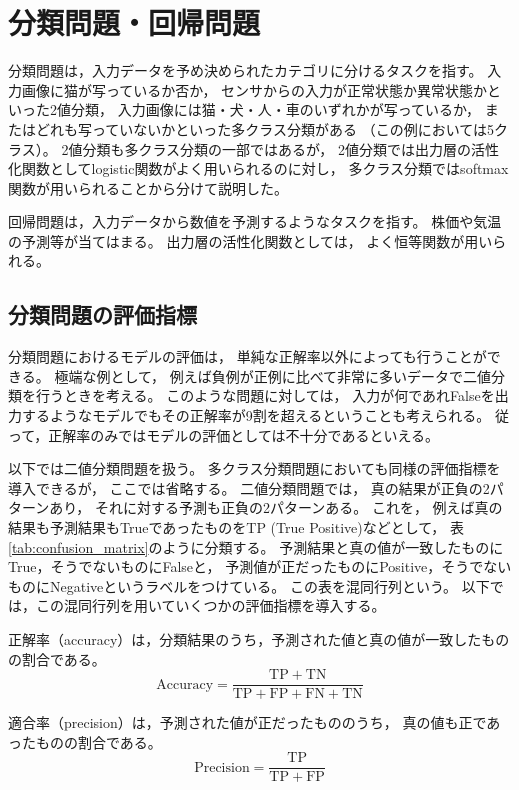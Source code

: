 \documentclass[class=jsarticle, crop=false, dvipdfmx, fleqn]{standalone}
\begin{document}
\section{分類問題・回帰問題}

分類問題は，入力データを予め決められたカテゴリに分けるタスクを指す。
入力画像に猫が写っているか否か，
センサからの入力が正常状態か異常状態かといった2値分類，
入力画像には猫・犬・人・車のいずれかが写っているか，
またはどれも写っていないかといった多クラス分類がある
（この例においては5クラス）。
2値分類も多クラス分類の一部ではあるが，
2値分類では出力層の活性化関数としてlogistic関数がよく用いられるのに対し，
多クラス分類ではsoftmax関数が用いられることから分けて説明した。

回帰問題は，入力データから数値を予測するようなタスクを指す。
株価や気温の予測等が当てはまる。
出力層の活性化関数としては，
よく恒等関数が用いられる。


\subsection{分類問題の評価指標}

分類問題におけるモデルの評価は，
単純な正解率以外によっても行うことができる。
極端な例として，
例えば負例が正例に比べて非常に多いデータで二値分類を行うときを考える。
このような問題に対しては，
入力が何であれFalseを出力するようなモデルでもその正解率が9割を超えるということも考えられる。
従って，正解率のみではモデルの評価としては不十分であるといえる。

以下では二値分類問題を扱う。
多クラス分類問題においても同様の評価指標を導入できるが，
ここでは省略する。
二値分類問題では，
真の結果が正負の2パターンあり，
それに対する予測も正負の2パターンある。
これを，
例えば真の結果も予測結果もTrueであったものをTP (True Positive)などとして，
表\ref{tab:confusion_matrix}のように分類する。
予測結果と真の値が一致したものにTrue，そうでないものにFalseと，
予測値が正だったものにPositive，そうでないものにNegativeというラベルをつけている。
この表を混同行列という。
以下では，この混同行列を用いていくつかの評価指標を導入する。

正解率（accuracy）は，分類結果のうち，予測された値と真の値が一致したものの割合である。
\begin{equation}
\text{Accuracy} = \frac{\mathrm{TP + TN}}{\mathrm{TP + FP + FN + TN}}
\end{equation}

適合率（precision）は，予測された値が正だったもののうち，
真の値も正であったものの割合である。
\begin{equation}
\text{Precision} = \frac{\mathrm{TP}}{\mathrm{TP + FP}}
\end{equation}
\end{document}
